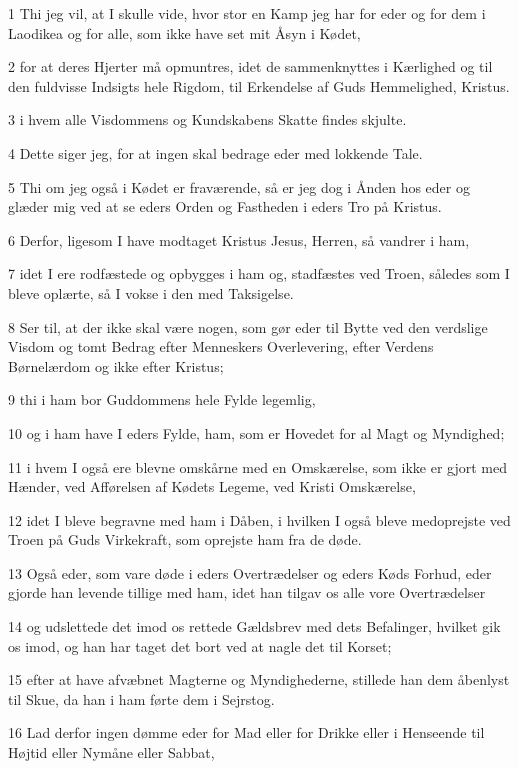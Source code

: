 \par 1 Thi jeg vil, at I skulle vide, hvor stor en Kamp jeg har for eder og for dem i Laodikea og for alle, som ikke have set mit Åsyn i Kødet,
\par 2 for at deres Hjerter må opmuntres, idet de sammenknyttes i Kærlighed og til den fuldvisse Indsigts hele Rigdom, til Erkendelse af Guds Hemmelighed, Kristus.
\par 3 i hvem alle Visdommens og Kundskabens Skatte findes skjulte.
\par 4 Dette siger jeg, for at ingen skal bedrage eder med lokkende Tale.
\par 5 Thi om jeg også i Kødet er fraværende, så er jeg dog i Ånden hos eder og glæder mig ved at se eders Orden og Fastheden i eders Tro på Kristus.
\par 6 Derfor, ligesom I have modtaget Kristus Jesus, Herren, så vandrer i ham,
\par 7 idet I ere rodfæstede og opbygges i ham og, stadfæstes ved Troen, således som I bleve oplærte, så I vokse i den med Taksigelse.
\par 8 Ser til, at der ikke skal være nogen, som gør eder til Bytte ved den verdslige Visdom og tomt Bedrag efter Menneskers Overlevering, efter Verdens Børnelærdom og ikke efter Kristus;
\par 9 thi i ham bor Guddommens hele Fylde legemlig,
\par 10 og i ham have I eders Fylde, ham, som er Hovedet for al Magt og Myndighed;
\par 11 i hvem I også ere blevne omskårne med en Omskærelse, som ikke er gjort med Hænder, ved Afførelsen af Kødets Legeme, ved Kristi Omskærelse,
\par 12 idet I bleve begravne med ham i Dåben, i hvilken I også bleve medoprejste ved Troen på Guds Virkekraft, som oprejste ham fra de døde.
\par 13 Også eder, som vare døde i eders Overtrædelser og eders Køds Forhud, eder gjorde han levende tillige med ham, idet han tilgav os alle vore Overtrædelser
\par 14 og udslettede det imod os rettede Gældsbrev med dets Befalinger, hvilket gik os imod, og han har taget det bort ved at nagle det til Korset;
\par 15 efter at have afvæbnet Magterne og Myndighederne, stillede han dem åbenlyst til Skue, da han i ham førte dem i Sejrstog.
\par 16 Lad derfor ingen dømme eder for Mad eller for Drikke eller i Henseende til Højtid eller Nymåne eller Sabbat,
